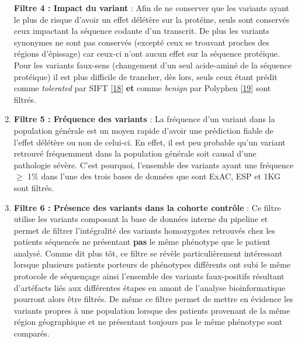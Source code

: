 \documentclass[12pt,twoside]{ugathesis}
\begin{document}
\begin{enumerate}
  \textbf{Filtre 4 : Impact du variant} : Afin de ne conserver que les
  variants ayant le plus de risque d'avoir un effet délétère sur la
  protéine, seuls sont conservés ceux impactant la séquence codante d'un
  transcrit. De plus les variants synonymes ne sont pas conservés
  (excepté ceux se trouvant proches des régions d'épissage) car ceux-ci
  n'ont aucun effet sur la séquence protéique. Pour les variants
  faux-sens (changement d'un seul acide-aminé de la séquence protéique)
  il est plus difficile de trancher, dès lors, seuls ceux étant prédit
  comme \emph{tolerated} par SIFT
  {[}\protect\hyperlink{ref-Kumar2009}{18}{]} \textbf{et} comme
  \emph{benign} par Polyphen
  {[}\protect\hyperlink{ref-Adzhubei2010}{19}{]} sont filtrés.
\item
  \textbf{Filtre 5 : Fréquence des variants} : La fréquence d'un variant
  dans la population générale est un moyen rapide d'avoir une prédiction
  fiable de l'effet délétère ou non de celui-ci. En effet, il est peu
  probable qu'un variant retrouvé fréquemment dans la population
  générale soit causal d'une pathologie sévère. C'est pourquoi,
  l'ensemble des variants ayant une fréquence \(\ge\) 1\% dans l'une des
  trois bases de données que sont ExAC, ESP et 1KG sont filtrés.
\item
  \textbf{Filtre 6 : Présence des variants dans la cohorte contrôle} :
  Ce filtre utilise les variants composant la base de données interne du
  pipeline et permet de filtrer l'intégralité des variants homozygotes
  retrouvés chez les patients séquencés ne présentant \textbf{pas} le
  même phénotype que le patient analysé. Comme dit plus tôt, ce filtre
  se révèle particulièrement intéressant lorsque plusieurs patients
  porteurs de phénotypes différents ont subi le même protocole de
  séquençage ainsi l'ensemble des variants faux-positifs résultant
  d'artéfacts liés aux différentes étapes en amont de l'analyse
  bioinformatique pourront alors être filtrés. De même ce filtre permet
  de mettre en évidence les variants propres à une population lorsque
  des patients provenant de la même région géographique et ne présentant
  toujours pas le même phénotype sont comparés.
\end{enumerate}
\end{document}
